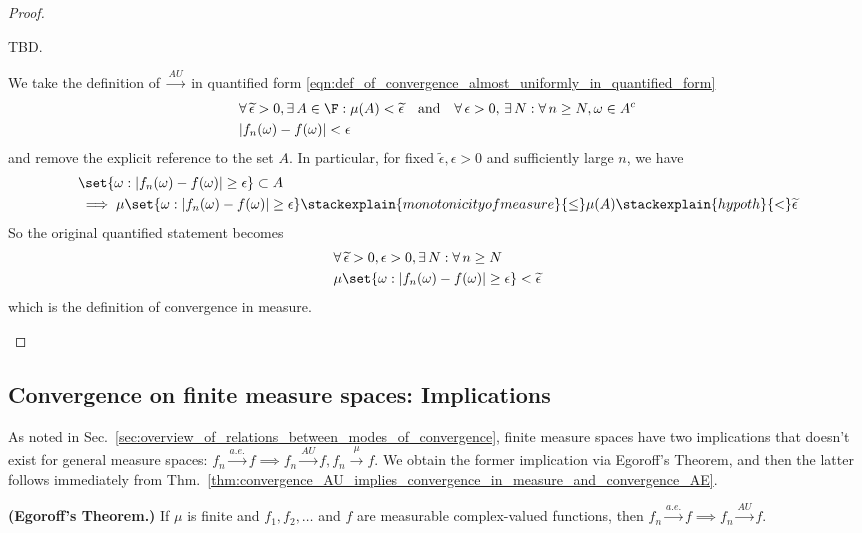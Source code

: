 \documentclass{article} %
\newcommand{\epsilontilde}{\widetilde{\epsilon}}
\newcommand{\convergenceAE}{\stackrel{a.e.}{\to}}
\newcommand{\convergenceAU}{\stackrel{AU}{\to}}
\newcommand{\convergenceInMu}{\stackrel{\mu}{\to}}
\begin{document}
\begin{proof}
\begin{alphabate}
\item TBD.
\item We take the definition of $\convergenceAU$ in quantified form \eqref{eqn:def_of_convergence_almost_uniformly_in_quantified_form} 
\begin{align*}
&\forall \, \epsilontilde >0, \exists \, A \in \F : \mu(A) < \epsilontilde \quad \text{and} \quad \forall \, \epsilon >0, \, \exists \, N : \forall \, n \geq N, \omega \in A^c \\
& |f_n(\omega) - f(\omega) | < \epsilon 
\end{align*}
and remove the explicit reference to the set $A$. In particular, for fixed $\epsilontilde, \epsilon>0$ and sufficiently large $n$, we have
\begin{align*} 
& \set{\omega : |f_n(\omega) - f(\omega) | \geq \epsilon  } \subset A \\
&\implies \mu\set{\omega : |f_n(\omega) - f(\omega) | \geq \epsilon  } \stackexplain{monotonicity of measure}{\leq} \mu(A) \stackexplain{hypoth}{<} \epsilontilde 
\end{align*}
So the original quantified statement becomes
\begin{align*}
&\forall \, \epsilontilde >0,  \epsilon >0, \exists \, N : \forall \, n \geq N \\
& \mu\set{\omega : |f_n(\omega) - f(\omega) | \geq \epsilon  } < \epsilontilde 
\end{align*}
which is the definition of convergence in measure. 
\end{alphabate}
\end{proof}

\subsection{Convergence on finite measure spaces: Implications}

As noted in Sec.~\ref{sec:overview_of_relations_between_modes_of_convergence}, finite measure spaces have two implications that doesn't exist for general measure spaces:  $f_n \convergenceAE f \implies f_n \convergenceAU f, f_n \convergenceInMu f$.  We obtain the former implication via Egoroff's Theorem, and then the latter follows immediately from Thm.~\ref{thm:convergence_AU_implies_convergence_in_measure_and_convergence_AE}.

\begin{theorem}\textbf{(Egoroff's Theorem.)} If $\mu$ is finite and $f_1, f_2, \hdots$ and $f$ are measurable complex-valued functions, then $f_n \convergenceAE f \implies f_n \convergenceAU f$.
\label{thm:egoroffs_theorem}
\end{theorem}
\end{document}
